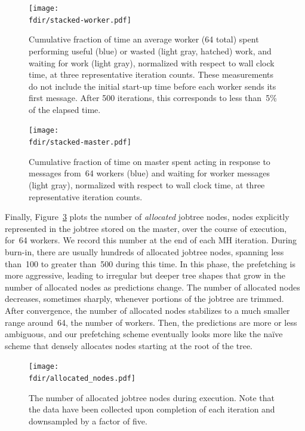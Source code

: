 \documentclass[angelino.tex]{subfiles}
\newcommand{\fdir}{/Users/elaine/Dropbox/nips12-mcmc/consolidate/mixture-thesis}
\begin{document}
\begin{figure}[t!]
\begin{center}
\texttt{[image: \\fdir/stacked-worker.pdf]}
\end{center}
\vspace{-0.1in}
\caption{Cumulative fraction of time an average worker (64 total) spent performing
useful (blue) or wasted (light gray, hatched) work, and waiting for work (light gray),
normalized with respect to wall clock time, at three representative iteration counts.
These measurements do not include the initial start-up time before each worker
sends its first \WANTWORK message.
After 500 iterations, this corresponds to less than~5\% of the elapsed time.}
\label{fig:stacked-worker}
\end{figure}
%
\begin{figure}[t!]
\begin{center}
\texttt{[image: \\fdir/stacked-master.pdf]}
\end{center}
\vspace{-0.1in}
\caption{Cumulative fraction of time on master spent acting in response to
messages from~64 workers (blue) and waiting for worker messages (light gray),
normalized with respect to wall clock time, at three representative iteration counts.}
\label{fig:stacked-master}
\end{figure}


Finally, Figure~\ref{fig:allocated-nodes} plots the number of \emph{allocated}
jobtree nodes, \ie nodes explicitly represented in the jobtree stored on the
master, over the course of execution, for~64 workers.
We record this number at the end of each MH iteration.
During burn-in, there are usually hundreds of allocated jobtree nodes,
spanning less than~100 to greater than~500 during this time.
In this phase, the prefetching is more aggressive, leading to irregular but
deeper tree shapes that grow in the number of allocated nodes as predictions change.
The number of allocated nodes decreases, sometimes sharply, whenever portions
of the jobtree are trimmed.
After convergence, the number of allocated nodes stabilizes to a much smaller
range around~64, the number of workers.
Then, the predictions are more or less ambiguous, and our prefetching scheme 
eventually looks more like the na\"ive scheme that densely
allocates nodes starting at the root of the tree.

\begin{figure}[t!]
\centering
\texttt{[image: \\fdir/allocated\_nodes.pdf]}
\caption{The number of allocated jobtree nodes during execution.
Note that the data have been collected upon completion of each iteration
and downsampled by a factor of five.}
\label{fig:allocated-nodes}
\end{figure}
\end{document}
